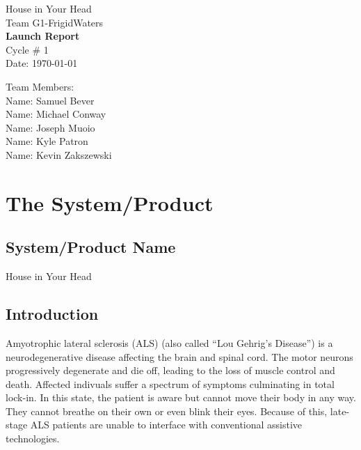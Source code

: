 \documentclass{report}
\begin{document}
\begin{titlepage}
    \begin{center}
        \begin{huge}
        House in Your Head \\[1cm]
        Team G1-FrigidWaters \\[2.2cm]
        { \bfseries Launch Report } \\[1cm]
        Cycle \# 1\\[2.2cm]
        Date: \required\today\\[1cm]
        \end{huge}
    \end{center}
    \null \vfill
    \begin{large}
        Team Members: \\[0.5cm]
        Name: Samuel Bever\\[0.5cm]
        Name: Michael Conway\\[0.5cm]
        Name: Joseph Muoio\\[0.5cm]
        Name: Kyle Patron\\[0.5cm]
        Name: Kevin Zakszewski
    \end{large}
\end{titlepage}

\section*{\centering The System/Product}

\subsection*{System/Product Name}

House in Your Head

\subsection*{Introduction}

Amyotrophic lateral sclerosis (ALS) (also called ``Lou Gehrig's Disease'') is
a neurodegenerative disease affecting the brain and spinal cord. The motor
neurons progressively degenerate and die off, leading to the loss of muscle
control and death. Affected indivuals suffer a spectrum of symptoms
culminating in total lock-in. In this state, the patient is aware but cannot
move their body in any way. They cannot breathe on their own or even blink
their eyes. Because of this, late-stage ALS patients are unable to interface
with conventional assistive technologies.\cite{ALSsource}
\end{document}
